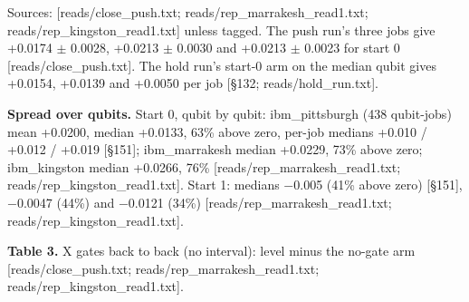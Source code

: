 \documentclass[11pt]{article}
\begin{document}
\par\smallskip\noindent{}\par\smallskip
Sources: {[}reads/close\_push.txt; reads/rep\_marrakesh\_read1.txt; reads/rep\_kingston\_read1.txt{]} unless tagged. The push run's three jobs give +0.0174 \(\pm\) 0.0028, +0.0213 \(\pm\) 0.0030 and +0.0213 \(\pm\) 0.0023 for start 0 {[}reads/close\_push.txt{]}. The hold run's start-0 arm on the median qubit gives +0.0154, +0.0139 and +0.0050 per job {[}\S{}132; reads/hold\_run.txt{]}.

\textbf{Spread over qubits.} Start 0, qubit by qubit: ibm\_pittsburgh (438 qubit-jobs) mean +0.0200, median +0.0133, 63\% above zero, per-job medians +0.010 / +0.012 / +0.019 {[}\S{}151{]}; ibm\_marrakesh median +0.0229, 73\% above zero; ibm\_kingston median +0.0266, 76\% {[}reads/rep\_marrakesh\_read1.txt; reads/rep\_kingston\_read1.txt{]}. Start 1: medians \(-\)0.005 (41\% above zero) {[}\S{}151{]}, \(-\)0.0047 (44\%) and \(-\)0.0121 (34\%) {[}reads/rep\_marrakesh\_read1.txt; reads/rep\_kingston\_read1.txt{]}.

\textbf{Table 3.} X gates back to back (no interval): level minus the no-gate arm {[}reads/close\_push.txt; reads/rep\_marrakesh\_read1.txt; reads/rep\_kingston\_read1.txt{]}.
\end{document}
